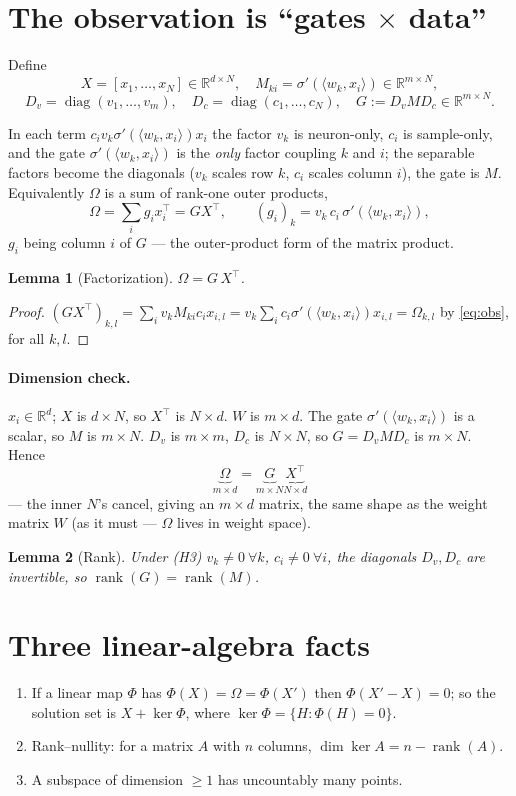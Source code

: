 \documentclass[11pt]{article}
\newtheorem{lemma}{Lemma}
\theoremstyle{definition}
\newcommand{\R}{\mathbb{R}}
\newcommand{\rank}{\operatorname{rank}}
\newcommand{\diag}{\operatorname{diag}}
\newcommand{\ip}[2]{\langle #1, #2\rangle}
\newcommand{\Om}{\Omega}
\begin{document}
\section{The observation is ``gates $\times$ data''}
Define
\[
X=[x_1,\dots,x_N]\in\R^{d\times N},\quad M_{ki}=\sigma'(\ip{w_k}{x_i})\in\R^{m\times N},
\]
\[
D_v=\diag(v_1,\dots,v_m),\quad D_c=\diag(c_1,\dots,c_N),\quad G:=D_v M D_c\in\R^{m\times N}.
\]

In each term $c_i v_k\sigma'(\ip{w_k}{x_i})x_i$ the factor $v_k$ is neuron-only, $c_i$ is
sample-only, and the gate $\sigma'(\ip{w_k}{x_i})$ is the \emph{only} factor coupling $k$ and $i$;
the separable factors become the diagonals ($v_k$ scales row $k$, $c_i$ scales column $i$), the
gate is $M$. Equivalently $\Om$ is a sum of rank-one outer products,
\[
\Om=\sum_i g_i x_i^\top=G X^\top,\qquad (g_i)_k=v_k\,c_i\,\sigma'(\ip{w_k}{x_i}),
\]
$g_i$ being column $i$ of $G$ --- the outer-product form of the matrix product.

\begin{lemma}[Factorization]\label{lem:fact}
$\Om = G\,X^{\top}$.
\end{lemma}
\begin{proof}
$(GX^\top)_{k,l}=\sum_i v_k M_{ki} c_i x_{i,l}=v_k\sum_i c_i\sigma'(\ip{w_k}{x_i})x_{i,l}
=\Om_{k,l}$ by \eqref{eq:obs}, for all $k,l$.
\end{proof}

\paragraph{Dimension check.}
$x_i\in\R^d$; $X$ is $d\times N$, so $X^\top$ is $N\times d$. $W$ is $m\times d$. The gate
$\sigma'(\ip{w_k}{x_i})$ is a scalar, so $M$ is $m\times N$. $D_v$ is $m\times m$, $D_c$ is
$N\times N$, so $G=D_v M D_c$ is $m\times N$. Hence
\[
\underbrace{\Om}_{m\times d}=\underbrace{G}_{m\times N}\underbrace{X^{\top}}_{N\times d}
\]
--- the inner $N$'s cancel, giving an $m\times d$ matrix, the same shape as the weight matrix $W$
(as it must --- $\Om$ lives in weight space).

\begin{lemma}[Rank]\label{lem:rank}
Under \emph{(H3)} $v_k\neq0\ \forall k$, $c_i\neq0\ \forall i$, the diagonals $D_v,D_c$ are
invertible, so $\rank(G)=\rank(M)$.
\end{lemma}

\section{Three linear-algebra facts}
\begin{enumerate}[label=(\roman*)]
\item If a linear map $\Phi$ has $\Phi(X)=\Om=\Phi(X')$ then $\Phi(X'-X)=0$; so the solution set is
$X+\ker\Phi$, where $\ker\Phi=\{H:\Phi(H)=0\}$.
\item Rank--nullity: for a matrix $A$ with $n$ columns, $\dim\ker A=n-\rank(A)$.
\item A subspace of dimension $\ge1$ has uncountably many points.
\end{enumerate}
\end{document}
